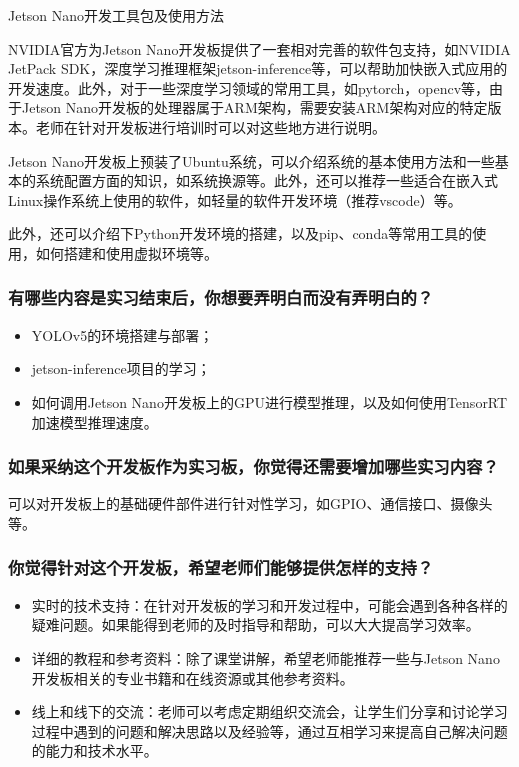 \documentclass[UTF8]{article}
\begin{document}
Jetson Nano开发工具包及使用方法

NVIDIA官方为Jetson Nano开发板提供了一套相对完善的软件包支持，如NVIDIA JetPack SDK，深度学习推理框架jetson-inference等，可以帮助加快嵌入式应用的开发速度。此外，对于一些深度学习领域的常用工具，如pytorch，opencv等，由于Jetson Nano开发板的处理器属于ARM架构，需要安装ARM架构对应的特定版本。老师在针对开发板进行培训时可以对这些地方进行说明。

Jetson Nano开发板上预装了Ubuntu系统，可以介绍系统的基本使用方法和一些基本的系统配置方面的知识，如系统换源等。此外，还可以推荐一些适合在嵌入式Linux操作系统上使用的软件，如轻量的软件开发环境（推荐vscode）等。

此外，还可以介绍下Python开发环境的搭建，以及pip、conda等常用工具的使用，如何搭建和使用虚拟环境等。


\subsubsection{有哪些内容是实习结束后，你想要弄明白而没有弄明白的？} 
\begin{itemize}
    \item YOLOv5的环境搭建与部署；
    \item jetson-inference项目的学习；
    \item 如何调用Jetson Nano开发板上的GPU进行模型推理，以及如何使用TensorRT加速模型推理速度。
\end{itemize}

\subsubsection{如果采纳这个开发板作为实习板，你觉得还需要增加哪些实习内容？}
可以对开发板上的基础硬件部件进行针对性学习，如GPIO、通信接口、摄像头等。

\subsubsection{你觉得针对这个开发板，希望老师们能够提供怎样的支持？} 
\begin{itemize}
    \item 实时的技术支持：在针对开发板的学习和开发过程中，可能会遇到各种各样的疑难问题。如果能得到老师的及时指导和帮助，可以大大提高学习效率。
    \item 详细的教程和参考资料：除了课堂讲解，希望老师能推荐一些与Jetson Nano开发板相关的专业书籍和在线资源或其他参考资料。
    \item 线上和线下的交流：老师可以考虑定期组织交流会，让学生们分享和讨论学习过程中遇到的问题和解决思路以及经验等，通过互相学习来提高自己解决问题的能力和技术水平。
\end{itemize}
\end{document}
